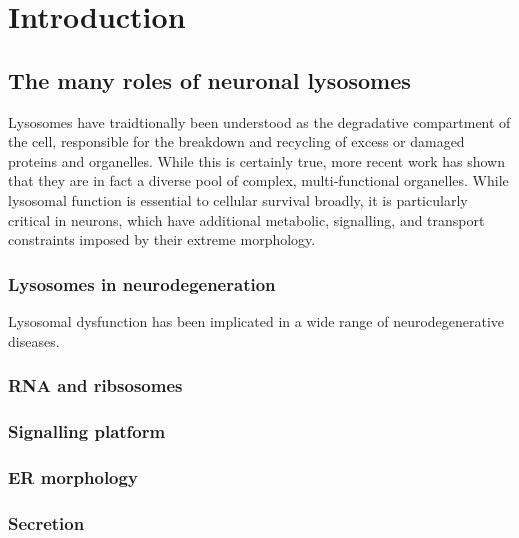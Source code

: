 \documentclass[
]{book}
\begin{document}
\hypertarget{introduction}{%
\section{Introduction}\label{introduction}}

\hypertarget{the-many-roles-of-neuronal-lysosomes}{%
\subsection{The many roles of neuronal lysosomes}\label{the-many-roles-of-neuronal-lysosomes}}

Lysosomes have traidtionally been understood as the degradative compartment of the cell, responsible for the breakdown and recycling of excess or damaged proteins and organelles. While this is certainly true, more recent work has shown that they are in fact a diverse pool of complex, multi-functional organelles. While lysosomal function is essential to cellular survival broadly, it is particularly critical in neurons, which have additional metabolic, signalling, and transport constraints imposed by their extreme morphology.

\hypertarget{lysosomes-in-neurodegeneration}{%
\subsubsection{Lysosomes in neurodegeneration}\label{lysosomes-in-neurodegeneration}}

Lysosomal dysfunction has been implicated in a wide range of neurodegenerative diseases.

\hypertarget{rna-and-ribsosomes}{%
\subsubsection{RNA and ribsosomes}\label{rna-and-ribsosomes}}

\hypertarget{signalling-platform}{%
\subsubsection{Signalling platform}\label{signalling-platform}}

\hypertarget{er-morphology}{%
\subsubsection{ER morphology}\label{er-morphology}}

\hypertarget{secretion}{%
\subsubsection{Secretion}\label{secretion}}
\end{document}
